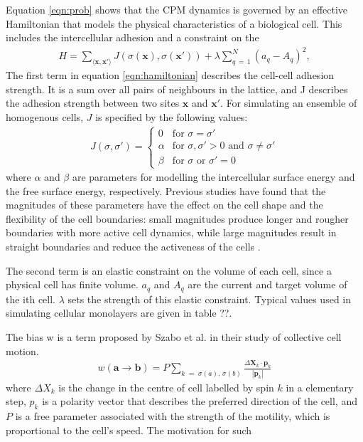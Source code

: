 \documentclass[a4paper,12pt]{article}
\newcommand{\abs}[1]{\left|#1\right|}
\newcommand{\inc}{\Delta}
\begin{document}
Equation \ref{eqn:prob} shows that the CPM dynamics is governed by an effective Hamiltonian that models the physical characteristics of a biological cell. This includes the intercellular adhesion and a constraint on the 
\begin{eqnarray}
\label{eqn:hamiltonian}
H = \sum_{\langle{\bm{x}, \bm{x'}\rangle}} J\left(\sigma(\bm{x}), \sigma(\bm{x'})\right) + \lambda \sum_{q\,=\,1}^{N} \left(a_q - A_q\right)^2,
\end{eqnarray}
The first term in equation \ref{eqn:hamiltonian} describes the cell-cell adhesion strength. It is a sum over all pairs of neighbours in the lattice, and J describes the adhesion strength between two sites $\bm{x}$ and $\bm{x'}$. For simulating an ensemble of homogenous cells, $J$ is specified by the following values:
\begin{eqnarray}
J(\sigma,\sigma') = \left\{
	\begin {array}{ll}
		0 & \textrm{for $\sigma = \sigma'$}\\
		\alpha & \textrm{for $\sigma, \sigma' > 0$ and $\sigma \neq \sigma'$}\\
		\beta & \textrm{for $\sigma$ or $\sigma' = 0$}
	\end{array}
\right.
\end{eqnarray}
where $\alpha$ and $\beta$ are parameters for modelling the intercellular surface energy and the free surface energy, respectively. Previous studies have found that the magnitudes of these parameters have the effect on the cell shape and the flexibility of the cell boundaries: small magnitudes produce longer and rougher boundaries with more active cell dynamics, while large magnitudes result in straight boundaries and reduce the activeness of the cells \cite{szabo2010}.

The second term is an elastic constraint on the volume of each cell, since a physical cell has finite volume. $a_q$ and $A_q$ are the current and target volume of the ith cell. $λ$ sets the strength of this elastic constraint. Typical values used in simulating cellular monolayers are given in table ??. 

The bias w is a term proposed by Szabo et al. in their study of collective cell motion. 
\begin{eqnarray}
w (\bm{a} \rightarrow \bm{b}) = P \sum_{k \;=\; \sigma(a),\,\sigma(b)} \frac{\inc \bm{X}_k \cdot \bm{p}_k}{\abs{\bm{p}_k}}
\end{eqnarray}
where $\inc X_k$ is the change in the centre of cell labelled by spin $k$ in a elementary step, $p_k$ is a polarity vector that describes the preferred direction of the cell, and $P$ is a free parameter associated with the strength of the motility, which is proportional to the cell’s speed. The motivation for such 
\end{document}
